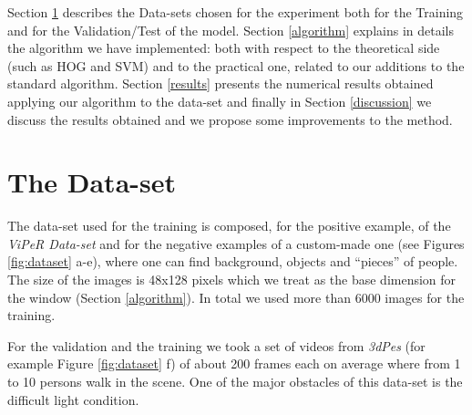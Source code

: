\documentclass[a4paper, 11pt, onecolumn]{article} %
\begin{document}
Section \ref{dataset} describes the Data-sets chosen for the experiment both for the Training and for the Validation/Test of the model. Section \ref{algorithm} explains in details the algorithm we have implemented: both with respect to the theoretical side (such as HOG and SVM) and to the practical one, related to our additions to the standard algorithm. Section \ref{results} presents the numerical results obtained applying our algorithm to the data-set and finally in Section \ref{discussion} we discuss the results obtained and we propose some improvements to the method.


\section{The Data-set}\label{dataset}
The data-set used for the training is composed, for the positive example, of the \emph{ViPeR Data-set} and for the negative examples of a custom-made one (see Figures \ref{fig:dataset} a-e), where one can find background, objects and ``pieces'' of people. 
The size of the images is 48x128 pixels which we treat as the base dimension for the window (Section \ref{algorithm}). In total we used more than 6000 images for the training.

For the validation and the training we took a set of videos from \emph{3dPes} (for example Figure \ref{fig:dataset} f) of about 200 frames each on average where from 1 to 10 persons walk in the scene. One of the major obstacles of this data-set is the difficult light condition.
\end{document}
